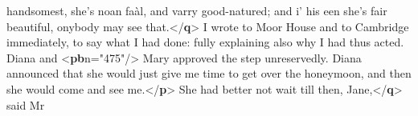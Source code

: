 \documentclass[11pt,twoside]{article}\makeatletter
\begin{document}
\begin{shaded}
\hspace*{1em}\hspace*{1em}\hspace*{1em}\hspace*{1em} handsomest, she's noan faàl, and varry good-natured;\mbox{}\newline 
\hspace*{1em}\hspace*{1em}\hspace*{1em}\hspace*{1em} and i' his een she's fair beautiful, onybody may see\mbox{}\newline 
\hspace*{1em}\hspace*{1em}\hspace*{1em}\hspace*{1em} that.{</\textbf{q}>}\mbox{}\newline 
{}\mbox{}\newline 
{}I wrote to Moor House and to Cambridge immediately, to\mbox{}\newline 
\hspace*{1em}\hspace*{1em} say what I had done: fully explaining also why I had thus\mbox{}\newline 
\hspace*{1em}\hspace*{1em} acted. Diana and {<\textbf{pb}\hspace*{1em}n="{475}"/>} Mary approved the step\mbox{}\newline 
\hspace*{1em}\hspace*{1em} unreservedly. Diana announced that she would just give me\mbox{}\newline 
\hspace*{1em}\hspace*{1em} time to get over the honeymoon, and then she would come and\mbox{}\newline 
\hspace*{1em}\hspace*{1em} see me.{</\textbf{p}>}\mbox{}\newline 
{}\mbox{}\newline 
\hspace*{1em}She had better not wait till then, Jane,{</\textbf{q}>} said Mr\mbox{}\newline 

\end{shaded}
\end{document}
